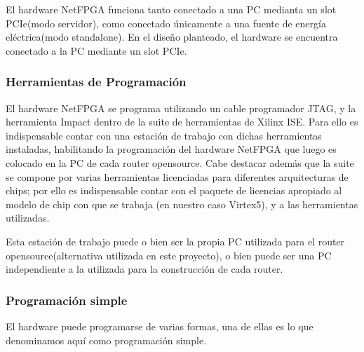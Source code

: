 El hardware NetFPGA funciona tanto conectado a una PC medianta un slot PCIe(modo servidor), como conectado \'unicamente a una fuente de energ\'ia el\'ectrica(modo standalone). En el dise\~no planteado, el hardware se encuentra conectado a la PC mediante un slot PCIe.


\subsubsection{Herramientas de Programaci\'on}

El hardware NetFPGA se programa utilizando un cable programador JTAG, y la herramienta Impact dentro de la suite de herramientas de Xilinx ISE. Para ello es indispensable contar con una estaci\'on de trabajo con dichas herramientas instaladas, habilitando la programaci\'on  del hardware NetFPGA que luego es colocado en la PC de cada router opensource. Cabe destacar adem\'as que la suite se compone por varias herramientas licenciadas para diferentes arquitecturas de chips; por ello es indispensable contar con el paquete de licencias apropiado al modelo de chip con que se trabaja (en nuestro caso Virtex5), y a las herramientas utilizadas. 

Esta estaci\'on de trabajo puede o bien ser la propia PC utilizada para el router opensource(alternativa utilizada en este proyecto), o bien puede ser una PC independiente a la utilizada para la construcci\'on de cada router.\\


\subsubsection{Programaci\'on simple}
El hardware puede programarse de varias formas, una de ellas es lo que denominamos aqu\'i como programaci\'on simple. 

